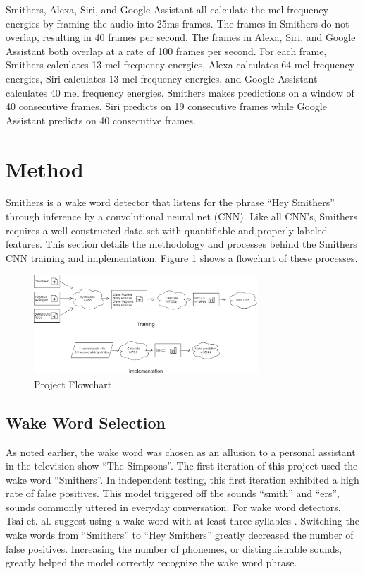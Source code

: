 \documentclass[conference]{IEEEtran}
\begin{document}
Smithers, Alexa, Siri, and Google Assistant all calculate the mel frequency energies
by framing the audio into 25ms frames.
The frames in Smithers do not overlap, resulting in 40 frames per second.
The frames in Alexa, Siri, and Google Assistant both overlap at a rate of 100 frames per second.
For each frame, Smithers calculates 13 mel frequency energies, Alexa calculates 64 mel frequency energies, 
Siri calculates 13 mel frequency energies, and Google Assistant calculates 40 mel frequency energies.
Smithers makes predictions on a window of 40 consecutive frames. 
Siri predicts on 19 consecutive frames while Google Assistant predicts on 40 consecutive frames.

\section{Method} \label{sec:method}

Smithers is a wake word detector that listens for the phrase ``Hey Smithers''
through inference by a convolutional neural net (CNN).
Like all CNN's, Smithers requires a well-constructed data set
with quantifiable and properly-labeled features.
This section details the methodology and processes
behind the Smithers CNN training and implementation.
Figure \ref{fig:flow} shows a flowchart of these processes.

\begin{figure}[htbp]
    \centerline{\includegraphics[width=0.75\textwidth]{figs/flow.png}}
    \caption{Project Flowchart}
    \label{fig:flow}
\end{figure}

\subsection{Wake Word Selection}
As noted earlier, the wake word was chosen
as an allusion to a personal assistant in the television show ``The Simpsons''.
The first iteration of this project used the wake word ``Smithers''.
In independent testing, this first iteration exhibited a high rate of false positives. 
This model triggered off the sounds ``smith'' and ``ers'',
sounds commonly uttered in everyday conversation.
For wake word detectors, Tsai et. al. suggest using a wake word
with at least three syllables \cite{syllables}. 
Switching the wake words from ``Smithers'' to ``Hey Smithers''
greatly decreased the number of false positives.
Increasing the number of phonemes, or distinguishable sounds, greatly helped the model 
correctly recognize the wake word phrase.
\end{document}
